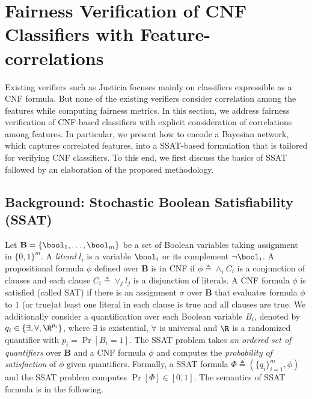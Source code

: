 




\section{Fairness Verification of CNF Classifiers with Feature-correlations} 
\label{sec:CNF_feature_correlation}
Existing verifiers such as Justicia focuses mainly on classifiers expressible as a CNF formula. But none of the existing verifiers consider correlation among the features while computing fairness metrics. In this section,  we address fairness verification of CNF-based classifiers with explicit consideration of correlations among features. In particular, we present how to encode a Bayesian network, which captures correlated features, into a SSAT-based formulation that is tailored for verifying CNF classifiers. To this end, we first discuss the basics of SSAT followed by an elaboration of the proposed methodology.



\subsection{Background: Stochastic Boolean Satisfiability (SSAT)}\label{sec:ssat}
Let $ \mathbf{B}  = \{\bool_1, \dots, \bool_m\}  $ be a set of Boolean variables taking assignment in $ \{0,1\}^m $. A \textit{literal} $ l_i $ is a variable $ \bool_i $ or its complement $ \neg \bool_i $. A propositional formula $\phi$ defined over $\mathbf{B}$ is in CNF if $\phi \triangleq \wedge_i C_i $   is  a conjunction of clauses and each clause $ C_i \triangleq \vee_j l_j $ is a disjunction of literals. A CNF formula $ \phi $ is satisfied (called SAT) if there is an assignment $ \sigma $ over $\mathbf{B}$ that evaluates formula $ \phi $ to $ 1 $ (or true)\textemdash at least one literal in each clause is true and all clauses are true. We additionally consider a quantification over each Boolean variable $ B_i $, denoted by $ q_i \in \{\exists, \forall, \R^{p_i}\}$, where $ \exists $ is existential, $ \forall $ is universal and $ \R $ is a randomized quantifier with $ p_i = \Pr[B_i = 1] $. The SSAT problem takes \textit{an ordered set of quantifiers} over  $\mathbf{B}$ and a CNF formula $ \phi $ and computes the \textit{probability of satisfaction} of $ \phi $ given quantifiers.  Formally, a SSAT formula $ \Phi \triangleq (\{q_i\}_{i=1}^{m}, \phi) $ and the SSAT problem computes $ \Pr[\Phi]  \in [0,1]$. The semantics of SSAT formula is in the following.

